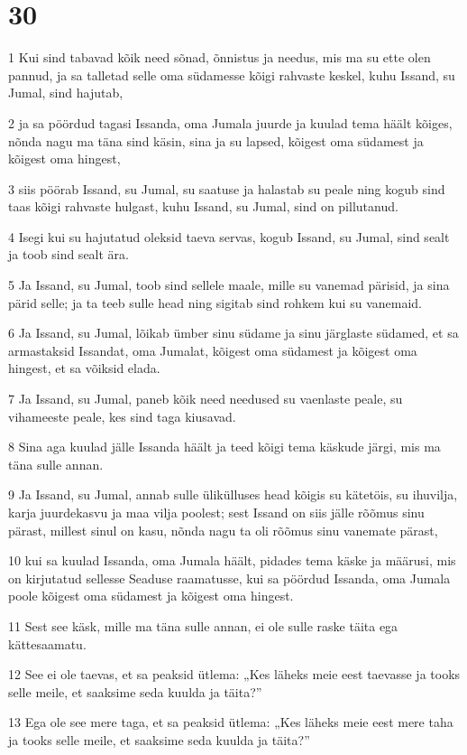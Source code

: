 \chapter{30}

\par 1 Kui sind tabavad kõik need sõnad, õnnistus ja needus, mis ma su ette olen pannud, ja sa talletad selle oma südamesse kõigi rahvaste keskel, kuhu Issand, su Jumal, sind hajutab,
\par 2 ja sa pöördud tagasi Issanda, oma Jumala juurde ja kuulad tema häält kõiges, nõnda nagu ma täna sind käsin, sina ja su lapsed, kõigest oma südamest ja kõigest oma hingest,
\par 3 siis pöörab Issand, su Jumal, su saatuse ja halastab su peale ning kogub sind taas kõigi rahvaste hulgast, kuhu Issand, su Jumal, sind on pillutanud.
\par 4 Isegi kui su hajutatud oleksid taeva servas, kogub Issand, su Jumal, sind sealt ja toob sind sealt ära.
\par 5 Ja Issand, su Jumal, toob sind sellele maale, mille su vanemad pärisid, ja sina pärid selle; ja ta teeb sulle head ning sigitab sind rohkem kui su vanemaid.
\par 6 Ja Issand, su Jumal, lõikab ümber sinu südame ja sinu järglaste südamed, et sa armastaksid Issandat, oma Jumalat, kõigest oma südamest ja kõigest oma hingest, et sa võiksid elada.
\par 7 Ja Issand, su Jumal, paneb kõik need needused su vaenlaste peale, su vihameeste peale, kes sind taga kiusavad.
\par 8 Sina aga kuulad jälle Issanda häält ja teed kõigi tema käskude järgi, mis ma täna sulle annan.
\par 9 Ja Issand, su Jumal, annab sulle ülikülluses head kõigis su kätetöis, su ihuvilja, karja juurdekasvu ja maa vilja poolest; sest Issand on siis jälle rõõmus sinu pärast, millest sinul on kasu, nõnda nagu ta oli rõõmus sinu vanemate pärast,
\par 10 kui sa kuulad Issanda, oma Jumala häält, pidades tema käske ja määrusi, mis on kirjutatud sellesse Seaduse raamatusse, kui sa pöördud Issanda, oma Jumala poole kõigest oma südamest ja kõigest oma hingest.
\par 11 Sest see käsk, mille ma täna sulle annan, ei ole sulle raske täita ega kättesaamatu.
\par 12 See ei ole taevas, et sa peaksid ütlema: „Kes läheks meie eest taevasse ja tooks selle meile, et saaksime seda kuulda ja täita?”
\par 13 Ega ole see mere taga, et sa peaksid ütlema: „Kes läheks meie eest mere taha ja tooks selle meile, et saaksime seda kuulda ja täita?”
